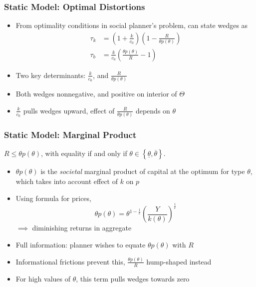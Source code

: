 \documentclass{beamer}
\begin{document}
\begin{frame}
    \frametitle{Static Model: Optimal Distortions}

    \begin{itemize}
        \item From optimality conditions in social planner's problem, can state wedges as 
        \begin{align*}
            \tau_{k}&=\left(1+\frac{k}{c_{0}}\right)\left(1-\frac{R}{\theta p\left(\theta\right)}\right) \\
        \tau_{b}&=\frac{k}{c_{0}}\left(\frac{\theta p\left(\theta\right)}{R} - 1\right) 
        \end{align*} 
        \item Two key determinants: \( \frac{k}{c_0} \), and \( \frac{R}{\theta p(\theta)} \) 
        \item Both wedges nonnegative, and positive on interior of \( \Theta \)
        \item \( \frac{k}{c_0} \) pulls wedges upward, effect of \( \frac{R}{\theta p(\theta)} \) depends on \( \theta \)
    \end{itemize}

\end{frame}

\begin{frame}
    \frametitle{Static Model: Marginal Product}

    \begin{lemma} \label{lem:thetap}
        \( R\le\theta p(\theta) \), with equality if and only if \( \theta\in\left\{ \underline{\theta},\overline{\theta}\right\}  \).
    \end{lemma}

    \begin{itemize}
        \item \( \theta p(\theta) \) is the \textit{societal} marginal product of capital at the optimum for type \( \theta \), which takes into account effect of \( k \) on \( p \)
        \item Using formula for prices, 
        \begin{equation*}
            \theta p(\theta) = \theta^{1-\frac{1}{\varepsilon}} \left(\frac{Y}{ k\left(\theta\right)}\right)^{\frac{1}{\varepsilon}}
        \end{equation*} 
        \( \implies \) diminishing returns in aggregate
        \item Full information: planner wishes to equate \( \theta p(\theta) \) with \( R \)
        \item Informational frictions prevent this, \( \frac{\theta p(\theta)}{R} \) hump-shaped instead 
        \item For high values of \( \theta \), this term pulls wedges towards zero
    \end{itemize}

\end{frame}
\end{document}
